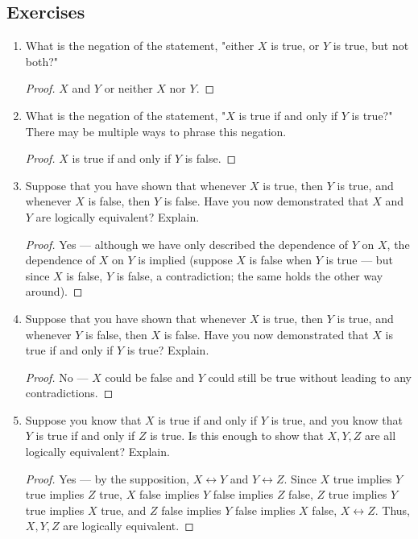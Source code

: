 \documentclass[../main.tex]{subfiles}
\begin{document}
\subsection*{Exercises}
\begin{enumerate}[ref={\thesection.\arabic*}]
    \item {}\label{exr:A.1.1}What is the negation of the statement, "either $X$ is true, or $Y$ is true, but not both?"
    \begin{proof}
        $X$ and $Y$ or neither $X$ nor $Y$.
    \end{proof}
    \item \label{exr:A.1.2}What is the negation of the statement, "$X$ is true if and only if $Y$ is true?" There may be multiple ways to phrase this negation.
    \begin{proof}
        $X$ is true if and only if $Y$ is false.
    \end{proof}
    \item \label{exr:A.1.3}Suppose that you have shown that whenever $X$ is true, then $Y$ is true, and whenever $X$ is false, then $Y$ is false. Have you now demonstrated that $X$ and $Y$ are logically equivalent? Explain.
    \begin{proof}
        Yes --- although we have only described the dependence of $Y$ on $X$, the dependence of $X$ on $Y$ is implied (suppose $X$ is false when $Y$ is true --- but since $X$ is false, $Y$ is false, a contradiction; the same holds the other way around).
    \end{proof}
    \item \label{exr:A.1.4}Suppose that you have shown that whenever $X$ is true, then $Y$ is true, and whenever $Y$ is false, then $X$ is false. Have you now demonstrated that $X$ is true if and only if $Y$ is true? Explain.
    \begin{proof}
        No --- $X$ could be false and $Y$ could still be true without leading to any contradictions.
    \end{proof}
    \item \label{exr:A.1.5}Suppose you know that $X$ is true if and only if $Y$ is true, and you know that $Y$ is true if and only if $Z$ is true. Is this enough to show that $X,Y,Z$ are all logically equivalent? Explain.
    \begin{proof}
        Yes --- by the supposition, $X\leftrightarrow Y$ and $Y\leftrightarrow Z$. Since $X$ true implies $Y$ true implies $Z$ true, $X$ false implies $Y$ false implies $Z$ false, $Z$ true implies $Y$ true implies $X$ true, and $Z$ false implies $Y$ false implies $X$ false, $X\leftrightarrow Z$. Thus, $X,Y,Z$ are logically equivalent.

\end{proof}
\end{enumerate}
\end{document}
